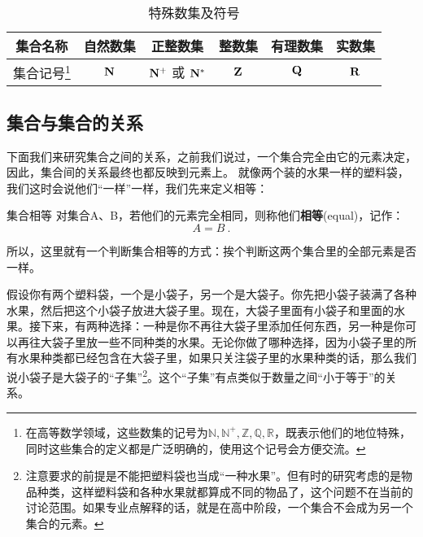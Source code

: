 \begin{table}[ht]
\centering
\caption{特殊数集及符号}\label{tab_HsSet2}
\begin{tabular}{|c|c|c|c|c|c|}
\hline
集合名称 &自然数集  &正整数集  & 整数集 & 有理数集& 实数集 \\
\hline
集合记号\footnote{在高等数学领域，这些数集的记号为$\mathbb{N,N^+,Z,Q,R}$，既表示他们的地位特殊，同时这些集合的定义都是广泛明确的，使用这个记号会方便交流。} & ${\rm \mathbf{N}}$ & ${\rm \mathbf{N^+}}$ 或 ${\rm \mathbf{N^*}}$ & ${\rm \mathbf{Z}}$ & ${\rm \mathbf{Q}}$ & ${\rm \mathbf{R}}$ \\
\hline
\end{tabular}
\end{table}

\subsection{集合与集合的关系}\label{sub_HsSet_1}
下面我们来研究集合之间的关系，之前我们说过，一个集合完全由它的元素决定，因此，集合间的关系最终也都反映到元素上。
就像两个装的水果一样的塑料袋，我们这时会说他们“一样”一样，我们先来定义相等：
\begin{definition}{集合相等}
对集合A、B，若他们的元素完全相同，则称他们\textbf{相等}(equal)，记作：
\begin{equation}
A=B~.
\end{equation}
\end{definition}

所以，这里就有一个判断集合相等的方式：挨个判断这两个集合里的全部元素是否一样。


假设你有两个塑料袋，一个是小袋子，另一个是大袋子。你先把小袋子装满了各种水果，然后把这个小袋子放进大袋子里。现在，大袋子里面有小袋子和里面的水果。接下来，有两种选择：一种是你不再往大袋子里添加任何东西，另一种是你可以再往大袋子里放一些不同种类的水果。无论你做了哪种选择，因为小袋子里的所有水果种类都已经包含在大袋子里，如果只关注袋子里的水果种类的话，那么我们说小袋子是大袋子的“子集”\footnote{注意要求的前提是不能把塑料袋也当成“一种水果”。但有时的研究考虑的是物品种类，这样塑料袋和各种水果就都算成不同的物品了，这个问题不在当前的讨论范围。如果专业点解释的话，就是在高中阶段，一个集合不会成为另一个集合的元素。}。这个“子集”有点类似于数量之间“小于等于”的关系。

